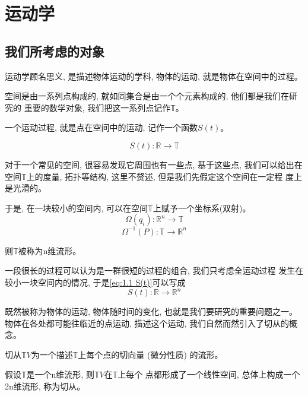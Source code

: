 \documentclass{ctexart}
\numberwithin{equation}{subsection}
\numberwithin{theorem}{subsection}
\numberwithin{definition}{subsection}
\numberwithin{proof}{subsection}
\numberwithin{lemma}{subsection}
\numberwithin{example}{subsection}
\numberwithin{remark}{subsection}
\numberwithin{corollary}{subsection}
\numberwithin{exercise}{subsection}
\numberwithin{problem}{subsection}
\numberwithin{question}{section}
\numberwithin{method}{subsection}
\begin{document}
    \section{运动学}
    \subsection{我们所考虑的对象}
    运动学顾名思义, 是描述物体运动的学科, 物体的运动, 就是物体在空间中的过程。

    空间是由一系列点构成的, 就如同集合是由一个个元素构成的, 他们都是我们在研究的
    重要的数学对象, 我们把这一系列点记作$\mathbb{T}$。

    一个运动过程, 就是点在空间中的运动, 记作一个函数$S(t)$。
    
    \begin{equation}
        \label{eq:1.1 S(t)}
        S(t):\mathbb{R} \rightarrow \mathbb{T}
    \end{equation}

    对于一个常见的空间, 很容易发现它周围也有一些点, 基于这些点, 我们可以给出在
    空间$\mathbb{T}$上的度量, 拓扑等结构, 这里不赘述, 但是我们先假定这个空间在一定程
    度上是光滑的。

    于是, 在一块较小的空间内, 可以在空间$\mathbb{T}$上赋予一个坐标系(双射)。
    \begin{equation}
        \Omega(q_i):\mathbb{R}^n \rightarrow \mathbb{T}
    \end{equation}
    \begin{equation}
        \Omega^{-1}(P):\mathbb{T} \rightarrow \mathbb{R}^n
    \end{equation}

    则$\mathbb{T}$被称为n维流形。

    一段很长的过程可以认为是一群很短的过程的组合, 我们只考虑全运动过程
    发生在较小一块空间内的情况, 于是\ref{eq:1.1 S(t)}可以写成
    \begin{equation}
        S(t):\mathbb{R} \rightarrow \mathbb{R}^n
    \end{equation}

    既然被称为物体的运动, 物体随时间的变化, 也就是我们要研究的重要问题之一。
    物体在各处都可能往临近的点运动, 描述这个运动, 我们自然而然引入了切从的概念。

    切从$\mathbb{T}V$为一个描述$\mathbb{T}$上每个点的切向量 (微分性质) 的流形。

    假设$\mathbb{T}$是一个n维流形, 则$\mathbb{T}V$在$\mathbb{T}$上每个
    点都形成了一个线性空间, 总体上构成一个2n维流形, 称为切从。
\end{document}
